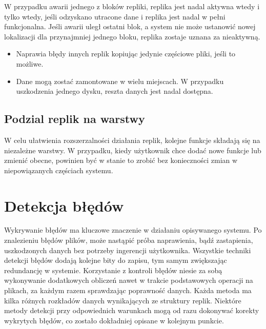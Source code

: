 W przypadku awarii jednego z bloków repliki, replika jest nadal aktywna wtedy i tylko wtedy, jeśli odzyskano utracone dane i replika jest nadal w pełni funkcjonalna. Jeśli awarii uległ ostatni blok, a system nie może ustanowić nowej lokalizacji dla przynajmniej jednego bloku, replika zostaje uznana za nieaktywną.
\begin{itemize}
    \item Naprawia błędy innych replik kopiując jedynie częściowe pliki, jeśli to możliwe.
    \item Dane mogą zostać zamontowane w wielu miejscach. W przypadku uszkodzenia jednego dysku, reszta danych jest nadal dostępna.
\end{itemize}

\subsection{Podzial replik na warstwy}
W celu ułatwienia rozszerzalności działania replik, kolejne funkcje składają się na niezależne warstwy. W przypadku, kiedy użytkownik chce dodać nowe funkcje lub zmienić obecne, powinien być w stanie to zrobić bez konieczności zmian w niepowiązanych częściach systemu.


\section {Detekcja błędów}
    Wykrywanie błędów ma kluczowe znaczenie w działaniu opisywanego systemu. Po znalezieniu błędów plików, może nastąpić próba naprawienia, bądź zastapienia, uszkodzonych danych bez potrzeby ingerencji użytkownika. Wszystkie techniki detekcji błędów dodają kolejne bity do zapisu, tym samym zwiększając redundancję w systemie. Korzystanie z kontroli błędów niesie za sobą wykonywanie dodatkowych obliczeń nawet w trakcie podstawowych operacji na plikach, za każdym razem sprawdzając poprawność danych. Każda metoda ma kilka różnych rozkładów danych wynikających ze struktury replik. Niektóre metody detekcji przy odpowiednich warunkach mogą od razu dokonywać korekty wykrytych błędów, co zostało dokładniej opisane w kolejnym punkcie.
